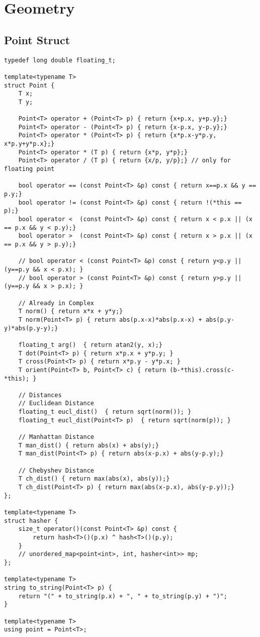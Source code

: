 \documentclass[10pt,letterpaper,twocolumn,twosided]{article}
\begin{document}

\section{Geometry}

\subsection{Point Struct}
\begin{lstlisting}
typedef long double floating_t;

template<typename T>
struct Point {
    T x;
    T y;

    Point<T> operator + (Point<T> p) { return {x+p.x, y+p.y};}
    Point<T> operator - (Point<T> p) { return {x-p.x, y-p.y};}
    Point<T> operator * (Point<T> p) { return {x*p.x-y*p.y, x*p.y+y*p.x};}
    Point<T> operator * (T p) { return {x*p, y*p};}
    Point<T> operator / (T p) { return {x/p, y/p};} // only for floating point
    
    bool operator == (const Point<T> &p) const { return x==p.x && y == p.y;}
    bool operator != (const Point<T> &p) const { return !(*this == p);}
    bool operator <  (const Point<T> &p) const { return x < p.x || (x == p.x && y < p.y);}
    bool operator >  (const Point<T> &p) const { return x > p.x || (x == p.x && y > p.y);}
    
    // bool operator < (const Point<T> &p) const { return y<p.y || (y==p.y && x < p.x); }
    // bool operator > (const Point<T> &p) const { return y>p.y || (y==p.y && x > p.x); }
    
    // Already in Complex
    T norm() { return x*x + y*y;}
    T norm(Point<T> p) { return abs(p.x-x)*abs(p.x-x) + abs(p.y-y)*abs(p.y-y);}
    
    floating_t arg()  { return atan2(y, x);}
    T dot(Point<T> p) { return x*p.x + y*p.y; }
    T cross(Point<T> p) { return x*p.y - y*p.x; }
    T orient(Point<T> b, Point<T> c) { return (b-*this).cross(c-*this); }
    
    // Distances
    // Euclidean Distance
    floating_t eucl_dist()  { return sqrt(norm()); }
    floating_t eucl_dist(Point<T> p)  { return sqrt(norm(p)); }
    
    // Manhattan Distance
    T man_dist() { return abs(x) + abs(y);}
    T man_dist(Point<T> p) { return abs(x-p.x) + abs(y-p.y);}
    
    // Chebyshev Distance
    T ch_dist() { return max(abs(x), abs(y));}
    T ch_dist(Point<T> p) { return max(abs(x-p.x), abs(y-p.y));}
};

template<typename T>
struct hasher {
    size_t operator()(const Point<T> &p) const { 
        return hash<T>()(p.x) ^ hash<T>()(p.y);
    }
    // unordered_map<point<int>, int, hasher<int>> mp;
};

template<typename T>
string to_string(Point<T> p) {
    return "(" + to_string(p.x) + ", " + to_string(p.y) + ")";
}

template<typename T>
using point = Point<T>;
\end{lstlisting}
\end{document}
